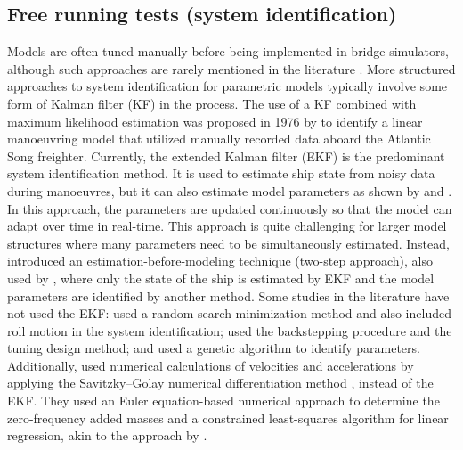 \subsection{Free running tests (system identification)} \label{sec:FT} %
Models are often tuned manually before being implemented in bridge simulators, although such approaches are rarely mentioned in the literature \cite{sutuloAlgorithmOfflineIdentification2014}. More structured approaches to system identification for parametric models typically involve some form of Kalman filter (KF) in the process. The use of a KF combined with maximum likelihood estimation was proposed in 1976 by \textcite{astromIdentificationShipSteering1976} to identify a linear manoeuvring model that utilized manually recorded data aboard the Atlantic Song freighter. Currently, the extended Kalman filter (EKF) is the predominant system identification method. It is used to estimate ship state from noisy data during manoeuvres, but it can also estimate model parameters as shown by \textcite{shiIdentificationShipManeuvering2009} and \textcite{pereraSystemIdentificationNonlinear2015}. In this approach, the parameters are updated continuously so that the model can adapt over time in real-time. This approach is quite challenging for larger model structures where many parameters need to be simultaneously estimated. Instead, \textcite{yoonIdentificationHydrodynamicCoefficients2003} introduced an estimation-before-modeling technique  (two-step approach), also used by \textcite{revestidoherreroTwostepIdentificationNonlinear2012}, where only the state of the ship is estimated by EKF and the model parameters are identified by another method.  
Some studies in the literature have not used the EKF: \textcite{tianoMultivariableIdentificationShip1997} used a random search minimization method and also included roll motion in the system identification; \textcite{casadoIdentificationNonlinearShip2005} used the backstepping procedure and the tuning design method; and \textcite{millerShipModelIdentification2021} used a genetic algorithm to identify parameters. Additionally, 
\textcite{chillcceDatadrivenSystemIdentification2023} used numerical calculations of velocities and accelerations by applying the Savitzky–Golay numerical differentiation method \cite{ahnertNumericalDifferentiationExperimental2007}, instead of the EKF. They used an Euler equation-based numerical approach \cite{elmoctarEfficientAccurateApproach2022}  to determine the zero-frequency added masses and a constrained least-squares algorithm for linear regression, akin to the approach by \textcite{arakiEstimatingManeuveringCoefficients2012}.

